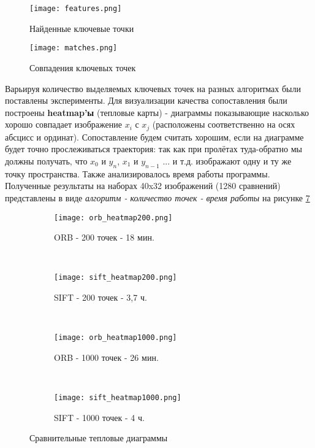 \begin{figure}[h]
    \centering
    \texttt{[image: features.png]}
    \caption{Найденные ключевые точки}
    \label{fig:features}
\end{figure}

\begin{figure}[h]
    \centering
    \texttt{[image: matches.png]}
    \caption{Совпадения ключевых точек}
    \label{fig:matches}
\end{figure}

Варьируя количество выделяемых ключевых точек на разных алгоритмах были поставлены эксперименты. Для визуализации качества сопоставления были построены \textbf{heatmap'ы} (тепловые карты) - диаграммы показывающие насколько хорошо совпадает изображение $x_i$ с $x_j$ (расположены соответственно на осях абсцисс и ординат). Сопоставление будем считать хорошим, если на диаграмме будет точно прослеживаться траектория: так как при пролётах туда-обратно мы должны получать, что $x_0$ и $y_n$, $x_1$ и $y_{n-1}$ ... и т.д. изображают одну и ту же точку пространства. Также анализировалось время работы программы. Полученные результаты на наборах 40x32 изображений (1280 сравнений) представлены в виде \textit{алгоритм - количество точек - время работы} на рисунке \ref{fig:heatmaps}

\begin{figure}[h]
    \centering
    \begin{subfigure}[h]{0.45\textwidth}
        \texttt{[image: orb\_heatmap200.png]}
        \caption{ORB - 200 точек - 18 мин.}
        \label{fig:orb_200}
    \end{subfigure}
    ~ 
    \begin{subfigure}[h]{0.45\textwidth}
        \texttt{[image: sift\_heatmap200.png]}
        \caption{SIFT - 200 точек - 3,7 ч.}
        \label{fig:sift_200}
    \end{subfigure}
    ~ 
    \begin{subfigure}[h]{0.45\textwidth}
        \texttt{[image: orb\_heatmap1000.png]}
        \caption{ORB - 1000 точек - 26 мин.}
        \label{fig:mouse}
    \end{subfigure}
    ~
    \begin{subfigure}[h]{0.45\textwidth}
        \texttt{[image: sift\_heatmap1000.png]}
        \caption{SIFT - 1000 точек - 4 ч.}
        \label{fig:mouse}
    \end{subfigure}
    \caption{Сравнительные тепловые диаграммы}
    \label{fig:heatmaps}
\end{figure}

